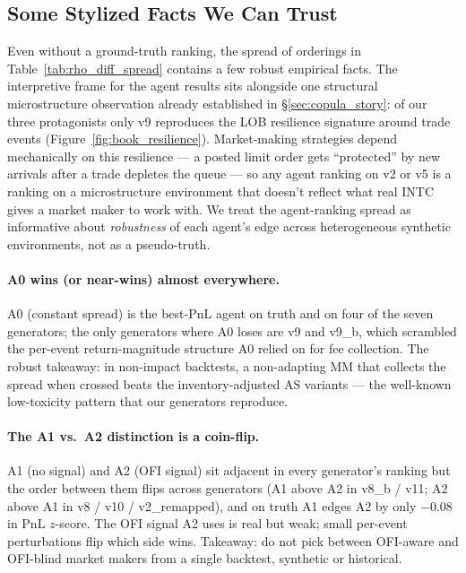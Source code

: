\documentclass[journal]{IEEEtran}
\theoremstyle{definition}   %
\begin{document}
\subsection{Some Stylized Facts We Can Trust}
\label{sec:agent_implications}

Even without a ground-truth ranking, the spread of orderings in
Table~\ref{tab:rho_diff_spread} contains a few robust empirical
facts. The interpretive frame for the agent results sits alongside
one structural microstructure observation already established in
\S\ref{sec:copula_story}: of our three protagonists only v9
reproduces the LOB resilience signature around trade events
(Figure~\ref{fig:book_resilience}). Market-making strategies
depend mechanically on this resilience --- a posted limit order
gets ``protected'' by new arrivals after a trade depletes the
queue --- so any agent ranking on v2 or v5 is a ranking on a
microstructure environment that doesn't reflect what real INTC
gives a market maker to work with. We treat the agent-ranking
spread as informative about \emph{robustness} of each agent's edge
across heterogeneous synthetic environments, not as a pseudo-truth.

\paragraph{A0 wins (or near-wins) almost everywhere.} A0
(constant spread) is the best-PnL agent on truth and on four of
the seven generators; the only generators where A0 loses are v9
and v9\_b, which scrambled the per-event return-magnitude
structure A0 relied on for fee collection. The robust takeaway:
in non-impact backtests, a non-adapting MM that collects the
spread when crossed beats the inventory-adjusted AS variants ---
the well-known low-toxicity pattern \cite{avellaneda2008high}
that our generators reproduce.

\paragraph{The A1 vs.\ A2 distinction is a coin-flip.} A1 (no
signal) and A2 (OFI signal) sit adjacent in every generator's
ranking but the order between them flips across generators (A1
above A2 in v8\_b / v11; A2 above A1 in v8 / v10 / v2\_remapped),
and on truth A1 edges A2 by only $-0.08$ in PnL $z$-score. The
OFI signal A2 uses is real but weak; small per-event perturbations
flip which side wins. Takeaway: do not pick between OFI-aware and
OFI-blind market makers from a single backtest, synthetic or
historical.
\end{document}
